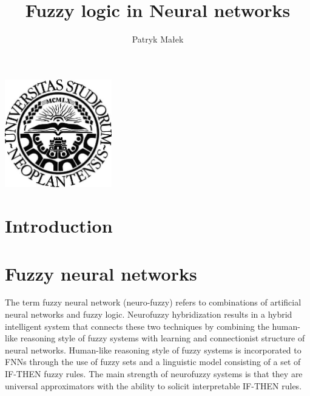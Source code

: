 \documentclass[a4paper,11pt]{article}
\newcommand{\mahtitle}{Fuzzy logic in Neural networks}
\begin{document}
\label{Title} 
\title{\mahtitle \vspace{1pc}}
\author{Patryk Małek \vspace{-0.7pc}}
\date{}%
\maketitle
\thispagestyle{empty}


\vspace{5pc}
\centerline{
\includegraphics[width=0.35\textwidth,height=0.35\textheight,keepaspectratio]{NoviSadLogoGray.jpg}
}
\vspace{11pc}

\begin{abstract}
\label{Abstract}

\end{abstract}




\pagebreak
\section{Introduction} 



\section{Fuzzy neural networks}
The term fuzzy neural network (neuro-fuzzy) refers to combinations of artificial neural networks and fuzzy logic.
Neurofuzzy hybridization results in a hybrid intelligent system that connects these two techniques by combining the human-like reasoning style of fuzzy systems with learning and connectionist structure of neural networks.
Human-like reasoning style of fuzzy systems is incorporated to FNNs through the use of fuzzy sets and a linguistic model consisting of a set of IF-THEN fuzzy rules.
The main strength of neurofuzzy systems is that they are universal approximators with the ability to solicit interpretable IF-THEN rules.
\end{document}
